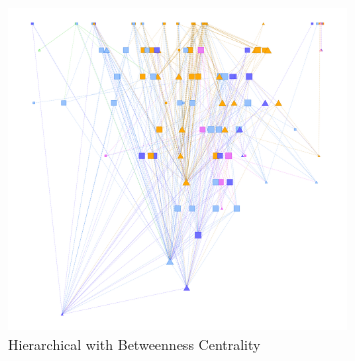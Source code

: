 \begin{figure}[p]
\centering
\includegraphics[width=0.8\textwidth]{img/regexp/hierarchical.png}
\caption{Hierarchical with Betweenness Centrality}\label{fig:regexp:hier}
\end{figure}

